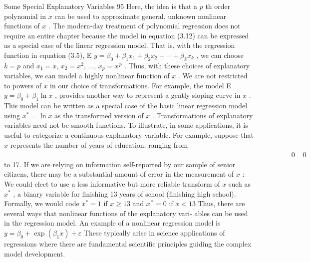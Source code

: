 \documentclass[11pt]{article}
\begin{document}
 Some Special Explanatory Variables 95
Here, the idea is that a \(p\) th order polynomial in \(x\) can be used to approximate
 general, unknown nonlinear functions of \(x\) .
 The modern-day treatment of polynomial regression does not require an entire
chapter because the model in equation (3.12) can be expressed as a special
case of the linear regression model. That is, with the regression function in
equation (3.5), E \(y=\beta_{0}+\beta_{1} x_{1}+\beta_{2} x_{2}+\cdots+\beta_{k} x_{k}\) , we can choose \(k=p\) and
\(x_{1}=x , \, x_{2}=x^{2} , \, \dots, \, x_{p}=x^{\, p}\) . Thus, with these choices of explanatory variables,
 we can model a highly nonlinear function of \(x\) .
We are not restricted to powers of \(x\) in our choice of transformations. For
example, the model E \(y=\beta_{0}+\beta_{1} \operatorname{l n} x\) , provides another way to represent a
 gently sloping curve in \(x\) . This model can be written as a special case of the basic
 linear regression model using \(x^{*}=\operatorname{l n} x\) as the transformed version of \(x\) .
Transformations of explanatory variables need not be smooth functions. To
 illustrate, in some applications, it is useful to categorize a continuous explanatory
 variable. For example, suppose that \(x\) represents the number of years of education,
ranging from \(\; \; \; \; \; \; \; \; \; \; \; \; \; \; \; \; \; \; \; \; \; \; \; \; \; \; \; \; \; \; \; \; \; \; \; \; \; \; \; \; \; \; \; \; \; \; \; \; \; \; \; \; \; \; \; \; \; \; \; \; \; \; \; \; \; \; \; \; \; \; \; \; \; \; \; \; \; \; \; \; \; \; \; \; \; \; \; \; \; \; \; \; \; \; \; \; \; \; \; \; \; \; \; \; \; \; \; \; \; \; \; \; \; \; \; \; \; \; \; \; \; \; \; \; \; \; \; \; \; \; \; \; \; \; \; \; \; \; \; \; \; \; \; \; \; \; \; \; 0 \; \; \; \; 0\) to 17. If we are relying on information self-reported by our sample
of senior citizens, there may be a substantial amount of error in the measurement
of \(x\) : We could elect to use a less informative but more reliable transform of
\(x\) such as \(x^{*}\) , a binary variable for finishing 13 years of school (finishing high
school). Formally, we would code \(x^{*}=1\) if \(x \geq1 3\) and \(x^{\, *}=0\) if \(x < 1 3\)
Thus, there are several ways that nonlinear functions of the explanatory vari-
 ables can be used in the regression model. An example of a nonlinear regression
 model is \(y=\beta_{0}+\operatorname{e x p} ( \beta_{1} x )+\varepsilon\) These typically arise in science applications of
regressions where there are fundamental scientific principles guiding the complex
 model development.
\end{document}
